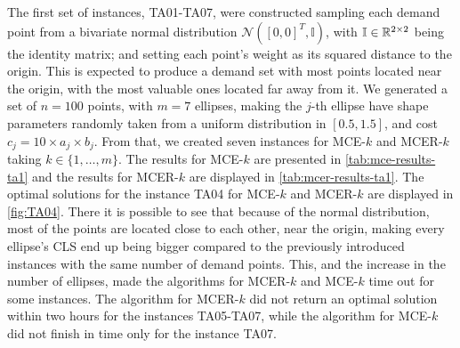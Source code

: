 The first set of instances, TA01-TA07, were constructed sampling each demand point from a bivariate normal distribution $\mathcal{N}([0, 0]^T, \mathbb{I})$, with $\mathbb{I} \in \mathbb{R}^{2\times 2}$ being the identity matrix; and setting each point's weight as its squared distance to the origin. This is expected to produce a demand set with most points located near the origin, with the most valuable ones located far away from it.
We generated a set of $n=100$ points, with $m=7$ ellipses, making the $j$-th ellipse have shape parameters randomly taken from a uniform distribution in $[0.5, 1.5]$, and cost $c_j=10\times a_j \times b_j$. From that, we created seven instances for MCE-$k$ and MCER-$k$ taking $k \in \{1, \dots, m\}$. The results for MCE-$k$ are presented in \autoref{tab:mce-results-ta1} and the results for MCER-$k$ are displayed in \autoref{tab:mcer-results-ta1}.
The optimal solutions for the instance TA04 for MCE-$k$ and MCER-$k$ are displayed in \autoref{fig:TA04}. There it is possible to see that because of the normal distribution, most of the points are located close to each other, near the origin, making every ellipse's CLS end up being bigger compared to the previously introduced instances with the same number of demand points. 
This, and the increase in the number of ellipses, made the algorithms for MCER-$k$ and MCE-$k$ time out for some instances. The algorithm for MCER-$k$ did not return an optimal solution within two hours for the instances TA05-TA07, while the algorithm for MCE-$k$ did not finish in time only for the instance TA07. 


